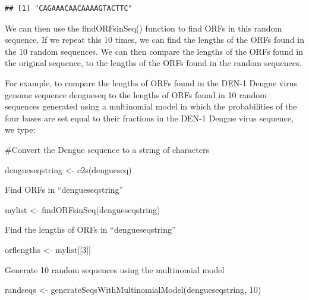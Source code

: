 \documentclass[
]{book}
\newenvironment{Shaded}{\begin{snugshade}}{\end{snugshade}}
\newcommand{\DecValTok}[1]{\textcolor[rgb]{0.00,0.00,0.81}{#1}}
\newcommand{\FunctionTok}[1]{\textcolor[rgb]{0.00,0.00,0.00}{#1}}
\newcommand{\NormalTok}[1]{#1}
\newcommand{\OtherTok}[1]{\textcolor[rgb]{0.56,0.35,0.01}{#1}}
\begin{document}
\begin{verbatim}
## [1] "CAGAAACAACAAAAGTACTTC"
\end{verbatim}

We can then use the findORFsinSeq() function to find ORFs in this random sequence. If we repeat this 10 times, we can find the lengths of the ORFs found in the 10 random sequences. We can then compare the lengths of the ORFs found in the original sequence, to the lengths of the ORFs found in the random sequences.

For example, to compare the lengths of ORFs found in the DEN-1 Dengue virus genome sequence dengueseq to the lengths of ORFs found in 10 random sequences generated using a multinomial model in which the probabilities of the four bases are set equal to their fractions in the DEN-1 Dengue virus sequence, we type:

\#Convert the Dengue sequence to a string of characters

\begin{Shaded}
\begin{Highlighting}[]
\NormalTok{dengueseqstring }\OtherTok{\textless{}{-}} \FunctionTok{c2s}\NormalTok{(dengueseq)   }
\end{Highlighting}
\end{Shaded}

Find ORFs in ``dengueseqstring''

\begin{Shaded}
\begin{Highlighting}[]
\NormalTok{mylist }\OtherTok{\textless{}{-}} \FunctionTok{findORFsinSeq}\NormalTok{(dengueseqstring)  }
\end{Highlighting}
\end{Shaded}

Find the lengths of ORFs in ``dengueseqstring''

\begin{Shaded}
\begin{Highlighting}[]
\NormalTok{orflengths }\OtherTok{\textless{}{-}}\NormalTok{ mylist[[}\DecValTok{3}\NormalTok{]]  }
\end{Highlighting}
\end{Shaded}

Generate 10 random sequences using the multinomial model

\begin{Shaded}
\begin{Highlighting}[]
\NormalTok{randseqs }\OtherTok{\textless{}{-}} \FunctionTok{generateSeqsWithMultinomialModel}\NormalTok{(dengueseqstring, }\DecValTok{10}\NormalTok{) }
\end{Highlighting}
\end{Shaded}
\end{document}
